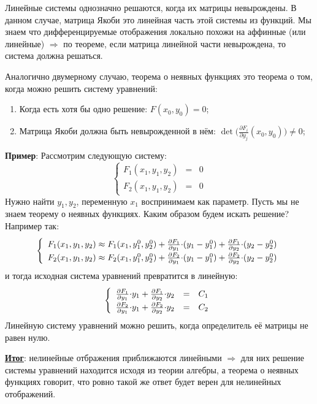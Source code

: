 \documentclass[12pt]{article}
\theoremstyle{definition}
\begin{document}
Линейные системы однозначно решаются, когда их матрицы невырождены. В данном случае, матрица Якоби это линейная часть этой системы из функций. Мы знаем что дифференцируемые отображения локально похожи на аффинные (или линейные) $\Rightarrow$ по теореме, если матрица линейной части невырождена, то система должна решаться.

Аналогично двумерному случаю, теорема о неявных функциях это теорема о том, когда можно решить систему уравнений:
\begin{enumerate}[label ={\arabic*)}]
	\item Когда есть хотя бы одно решение: $F(x_0,y_0) = 0$;
	\item Матрица Якоби должна быть невырожденной в нём: $\det{\big(\tfrac{\partial F_i}{\partial y_j}(x_0,y_0)\big)} \neq 0$;
\end{enumerate}

\textbf{Пример}: Рассмотрим следующую систему:
$$
	\left\{\begin{array}{ccc}
		F_1(x_1, y_1, y_2) & = &  0 \\
		F_2(x_1, y_1, y_2) & = &  0 
	\end{array}\right.
$$
Нужно найти $y_1, y_2$, переменную $x_1$ воспринимаем как параметр. Пусть мы не знаем теорему о неявных функциях. Каким образом будем искать решение? Например так:
$$
	\left\{
	\renewcommand\arraystretch{1.3}
		\begin{array}{c}
				F_1(x_1, y_1,y_2) \approx F_1(x_1,y_1^0, y_2^0) + \tfrac{\partial F_1}{\partial y_1}{\cdot}(y_1 - y_1^0) + \tfrac{\partial F_1}{\partial y_2}{\cdot}(y_2 - y_2^0)\\
				F_2(x_1, y_1,y_2) \approx F_2(x_1,y_1^0, y_2^0) + \tfrac{\partial F_2}{\partial y_1}{\cdot}(y_1 - y_1^0) + \tfrac{\partial F_2}{\partial y_2}{\cdot}(y_2 - y_2^0)
		\end{array}
	\right.
$$
и тогда исходная система уравнений превратится в линейную:
$$
	\left\{
	\renewcommand\arraystretch{1.3}
	\begin{array}{ccc}
		\tfrac{\partial F_1}{\partial y_1}{\cdot}y_1 + \tfrac{\partial F_1}{\partial y_2} {\cdot} y_2  & = &  C_1 \\
		\tfrac{\partial F_2}{\partial y_1}{\cdot}y_1 + \tfrac{\partial F_2}{\partial y_2} {\cdot} y_2  & = &  C_2
	\end{array}
	\right.
$$
Линейную систему уравнений можно решить, когда определитель её матрицы не равен нулю.

\textbf{\uline{Итог}}: нелинейные отбражения приближаются линейными $\Rightarrow$ для них решение системы уравнений находится исходя из теории алгебры, а теорема о неявных функциях говорит, что ровно такой же ответ будет верен для нелинейных отображений.
\end{document}
